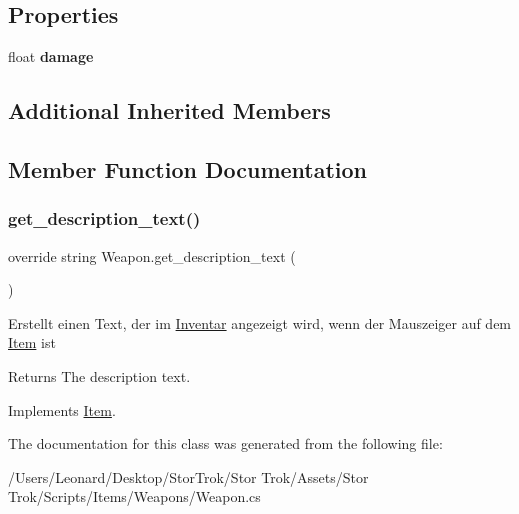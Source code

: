 \subsection*{Properties}
\begin{DoxyCompactItemize}
\item 
\mbox{\label{class_weapon_a67d637088f248dd13048b89e592ea63a}} 
float {\bfseries damage}
\end{DoxyCompactItemize}
\subsection*{Additional Inherited Members}


\subsection{Member Function Documentation}
\mbox{\label{class_weapon_a8fcfb4f08ea22a8fc60790770a58b985}} 
\subsubsection{\texorpdfstring{get\+\_\+description\+\_\+text()}{get\_description\_text()}}
{\footnotesize\ttfamily override string Weapon.\+get\+\_\+description\+\_\+text (\begin{DoxyParamCaption}{ }\end{DoxyParamCaption})\hspace{0.3cm}{\ttfamily [virtual]}}



Erstellt einen Text, der im \hyperlink{class_inventar}{Inventar} angezeigt wird, wenn der Mauszeiger auf dem \hyperlink{class_item}{Item} ist 

\begin{DoxyReturn}{Returns}
The description text.
\end{DoxyReturn}


Implements \hyperlink{class_item_ab868f8ccad92378f7352e3a9e0f755ff}{Item}.



The documentation for this class was generated from the following file\+:\begin{DoxyCompactItemize}
\item 
/\+Users/\+Leonard/\+Desktop/\+Stor\+Trok/\+Stor Trok/\+Assets/\+Stor Trok/\+Scripts/\+Items/\+Weapons/Weapon.\+cs\end{DoxyCompactItemize}
